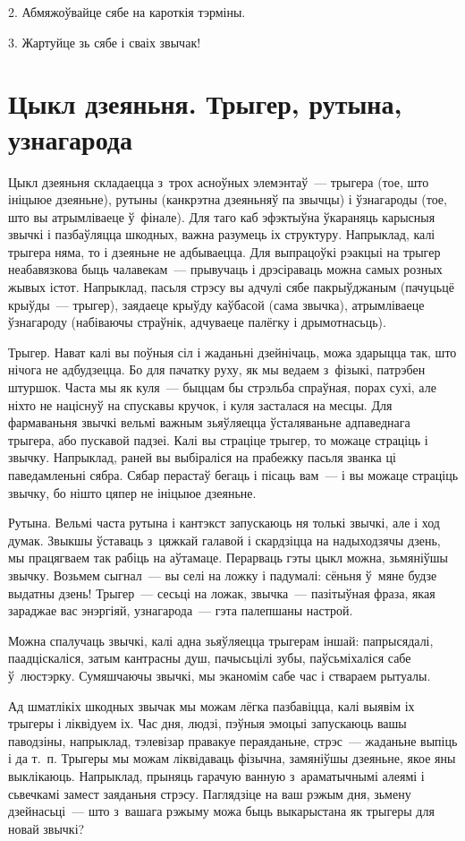2. Абмяжоўвайце сябе на кароткія тэрміны.

3. Жартуйце зь сябе і сваіх звычак!


\section{Цыкл дзеяньня. Трыгер, рутына, узнагарода}

Цыкл дзеяньня складаецца з~трох асноўных элемэнтаў~--- трыгера (тое, што ініцыюе дзеяньне), рутыны (канкрэтна дзеяньняў па звычцы) і ўзнагароды (тое, што вы атрымліваеце ў~фінале). Для таго каб эфэктыўна ўкараняць карысныя звычкі і пазбаўляцца шкодных, важна разумець іх структуру. Напрыклад, калі трыгера няма, то і дзеяньне не адбываецца. Для выпрацоўкі рэакцыі на трыгер неабавязкова быць чалавекам~--- прывучаць і дрэсіраваць можна самых розных жывых істот. Напрыклад, пасьля стрэсу вы адчулі сябе пакрыўджаным (пачуцьцё крыўды~--- трыгер), заядаеце крыўду каўбасой (сама звычка), атрымліваеце ўзнагароду (набіваючы страўнік, адчуваеце палёгку і дрымотнасьць).

Трыгер. Нават калі вы поўныя сіл і жаданьні дзейнічаць, можа здарыцца так, што нічога не адбудзецца. Бо для пачатку руху, як мы ведаем з~фізыкі, патрэбен штуршок. Часта мы як куля~--- быццам бы стрэльба спраўная, порах сухі, але ніхто не націснуў на спускавы кручок, і куля засталася на месцы. Для фармаваньня звычкі вельмі важным зьяўляецца ўсталяваньне адпаведнага трыгера, або пускавой падзеі. Калі вы страціце трыгер, то можаце страціць і звычку. Напрыклад, раней вы выбіраліся на прабежку пасьля званка ці паведамленьні сябра. Сябар перастаў бегаць і пісаць вам~--- і вы можаце страціць звычку, бо нішто цяпер не ініцыюе дзеяньне.

Рутына. Вельмі часта рутына і кантэкст запускаюць ня толькі звычкі, але і ход думак. Звыкшы ўставаць з~цяжкай галавой і скардзіцца на надыходзячы дзень, мы працягваем так рабіць на аўтамаце. Перарваць гэты цыкл можна, зьмяніўшы звычку. Возьмем сыгнал~--- вы селі на ложку і падумалі: сёньня ў~мяне будзе выдатны дзень! Трыгер~--- сесьці на ложак, звычка~--- пазітыўная фраза, якая зараджае вас энэргіяй, узнагарода~--- гэта палепшаны настрой.

Можна спалучаць звычкі, калі адна зьяўляецца трыгерам іншай: папрысядалі, паадціскаліся, затым кантрасны душ, пачысьцілі зубы, паўсьміхаліся сабе ў~люстэрку. Сумяшчаючы звычкі, мы эканомім сабе час і ствараем рытуалы.

Ад шматлікіх шкодных звычак мы можам лёгка пазбавіцца, калі выявім іх трыгеры і ліквідуем іх. Час дня, людзі, пэўныя эмоцыі запускаюць вашы паводзіны, напрыклад, тэлевізар правакуе пераяданьне, стрэс~--- жаданьне выпіць і да т.~п. Трыгеры мы можам ліквідаваць фізычна, замяніўшы дзеяньне, якое яны выклікаюць. Напрыклад, прыняць гарачую ванную з~араматычнымі алеямі і сьвечкамі замест заяданьня стрэсу. Паглядзіце на ваш рэжым дня, зьмену дзейнасьці~--- што з~вашага рэжыму можа быць выкарыстана як трыгеры для новай звычкі?

